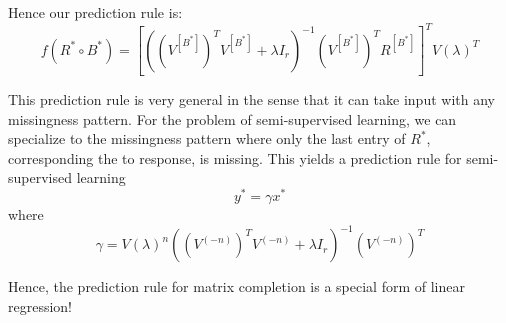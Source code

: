 \documentclass[11pt]{article}
\begin{document}
Hence our prediction rule is:
\[
f(R^* \circ B^*) = [((V^{[B^*]})^T V^{[B^*]} + \lambda I_r)^{-1} (V^{[B^*]})^T R^{[B^*]}]^T V(\lambda)^T
\]

This prediction rule is very general in the sense that it can take input with any missingness pattern.  For the problem of semi-supervised learning, we can specialize to the missingness pattern where only the last entry of $R^*$, corresponding the to response, is missing.  This yields a prediction rule for semi-supervised learning
\[
y^* = \gamma x^*
\]
where
\[
\gamma = V(\lambda)^n ((V^{(-n)})^T V^{(-n)} + \lambda I_r)^{-1} (V^{(-n)})^T
\]

Hence, the prediction rule for matrix completion is a special form of linear regression!
\end{document}
